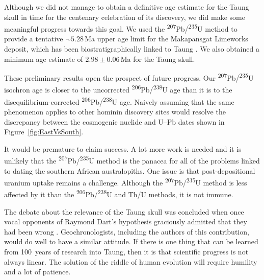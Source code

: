 \documentclass[11pt]{article}
\begin{document}
Although we did not manage to obtain a definitive age estimate for the
Taung skull in time for the centenary celebration of its discovery, we
did make some meaningful progress towards this goal. We used the
\textsuperscript{207}Pb/\textsuperscript{235}U method to provide a
tentative $\sim{5.28}$\,Ma upper age limit for the Makapansgat
Limeworks deposit, which has been biostratigraphically linked to Taung
\citep{mckee1993}. We also obtained a minimum age estimate of
$2.98\pm{0.06}$\,Ma for the Taung skull.

These preliminary results open the prospect of future progress.  Our
\textsuperscript{207}Pb/\textsuperscript{235}U isochron age is closer
to the uncorrected \textsuperscript{206}Pb/\textsuperscript{238}U age
than it is to the disequilibrium-corrected
\textsuperscript{206}Pb/\textsuperscript{238}U age. Naively assuming
that the same phenomenon applies to other hominin discovery sites
would resolve the discrepancy between the cosmogenic nuclide and U--Pb
dates shown in Figure~\ref{fig:EastVsSouth}.

It would be premature to claim success. A lot more work is needed and
it is unlikely that the \textsuperscript{207}Pb/\textsuperscript{235}U
method is the panacea for all of the problems linked to dating the
southern African australopiths. One issue is that post-depositional
uranium uptake remains a challenge. Although the
\textsuperscript{207}Pb/\textsuperscript{235}U method is less affected
by it than the \textsuperscript{206}Pb/\textsuperscript{238}U and Th/U
methods, it is not immune.

The debate about the relevance of the Taung skull was concluded when
once vocal opponents of Raymond Dart's hypothesis graciously admitted
that they had been wrong \citep{keith1947}. Geochronologists,
including the authors of this contribution, would do well to have a
similar attitude.  If there is one thing that can be learned from
100~years of research into Taung, then it is that scientific progress
is not always linear. The solution of the riddle of human evolution
will require humility and a lot of patience.\medskip
\end{document}
